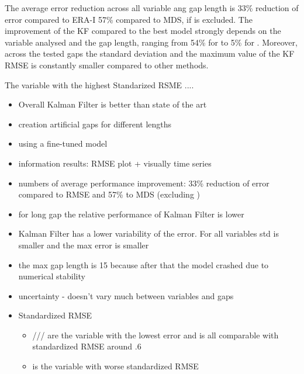 \documentclass{article}
\begin{document}
The average error reduction across all variable ang gap length is 33\% reduction of error compared to ERA-I 57\% compared to MDS, if  is excluded. The improvement of the KF compared to the best model strongly depends on the variable analysed and the gap length, ranging from 54\% for  to 5\% for . Moreover, across the tested gaps the standard deviation and the maximum value of the KF RMSE is constantly smaller compared to other methods. %

The variable with the highest Standarized RSME ....

\begin{itemize}
    \item Overall Kalman Filter is better than state of the art
    \item creation artificial gaps for different lengths
    \item using a fine-tuned model
    \item information results: RMSE plot + visually time series
    \item numbers of average performance improvement: 33\% reduction of error compared to RMSE and 57\% to MDS (excluding )
    \item for long gap the relative performance of Kalman Filter is lower
    \item Kalman Filter has a lower variability of the error. For all variables std is smaller and the max error is smaller
    \item the max gap length is 15 because after that the model crashed due to numerical stability
    \item uncertainty - doesn't vary much between variables and gaps
    \item Standardized RMSE
    \begin{itemize}
    \item {}/// are the variable with the lowest error and is all comparable with standardized RMSE around .6
    \item {} is the variable with worse standardized RMSE 
\end{itemize}
\end{itemize}
\end{document}
